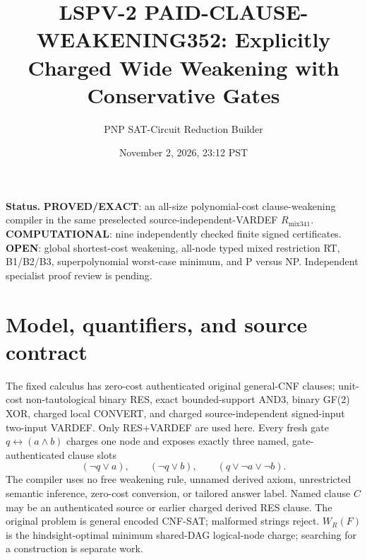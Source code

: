 \documentclass[11pt]{article}
\title{LSPV-2 PAID-CLAUSE-WEAKENING352: Explicitly Charged Wide Weakening with Conservative Gates}
\author{PNP SAT-Circuit Reduction Builder}
\date{November 2, 2026, 23:12 PST}
\begin{document}
\maketitle
\noindent\textbf{Status.} \textbf{PROVED/EXACT}: an all-size polynomial-cost clause-weakening compiler in the same preselected source-independent-VARDEF $R_{\mathrm{mix341}}$. \textbf{COMPUTATIONAL}: nine independently checked finite signed certificates. \textbf{OPEN}: global shortest-cost weakening, all-node typed mixed restriction RT, B1/B2/B3, superpolynomial worst-case minimum, and P versus NP. Independent specialist proof review is pending.

\section*{Model, quantifiers, and source contract}
The fixed calculus has zero-cost authenticated original general-CNF clauses; unit-cost non-tautological binary RES, exact bounded-support AND3, binary GF(2) XOR, charged local CONVERT, and charged source-independent signed-input two-input VARDEF. Only RES+VARDEF are used here. Every fresh gate $q\leftrightarrow(a\land b)$ charges one node and exposes exactly three named, gate-authenticated clause slots
\[
(\neg q\vee a),\qquad(\neg q\vee b),\qquad(q\vee\neg a\vee\neg b).
\]
The compiler uses no free weakening rule, unnamed derived axiom, unrestricted semantic inference, zero-cost conversion, or tailored answer label. Named clause $C$ may be an authenticated source or earlier charged derived RES clause. The original problem is general encoded CNF-SAT; malformed strings reject. $W_R(F)$ is the hindsight-optimal minimum shared-DAG logical-node charge; searching for a construction is separate work.
\end{document}

